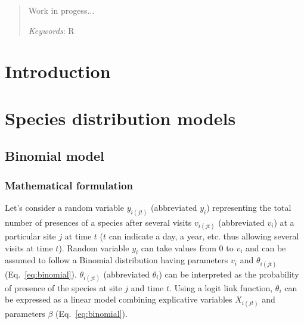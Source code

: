 \documentclass[a4paper, 12pt, leqno]{article}\usepackage[]{graphicx}\usepackage[]{color}
\begin{document}
\newpage

\renewcommand{\abstractname}{Abstract}
\newcommand{\keywords}[1]{\par\noindent
{\small{\em Keywords\/}: #1}}

\begin{abstract}

  Work in progess...
  
  \vspace{0.5cm}

  \keywords{R}

\end{abstract}

\newpage




\section{Introduction}

\section{Species distribution models}

\subsection{Binomial model}
\label{sec:binomial}

\subsubsection{Mathematical formulation}

Let's consider a random variable $y_{i(jt)}$ (abbreviated $y_i$) representing the total
number of presences of a species after several visits $v_{i(jt)}$ (abbreviated $v_i$) at a
particular site $j$ at time $t$ ($t$ can indicate a day, a year, etc. thus allowing
several visits at time $t$). Random variable $y_i$ can take values from 0 to $v_i$ and can
be assumed to follow a Binomial distribution having parameters $v_i$ and $\theta_{i(jt)}$
(Eq.~\ref{eq:binomial}). $\theta_{i(jt)}$ (abbreviated $\theta_i$) can be interpreted as
the probability of presence of the species at site $j$ and time $t$. Using a logit link
function, $\theta_i$ can be expressed as a linear model combining explicative variables
$X_{i(jt)}$ and parameters $\beta$ (Eq.~\ref{eq:binomial}).
\end{document}
